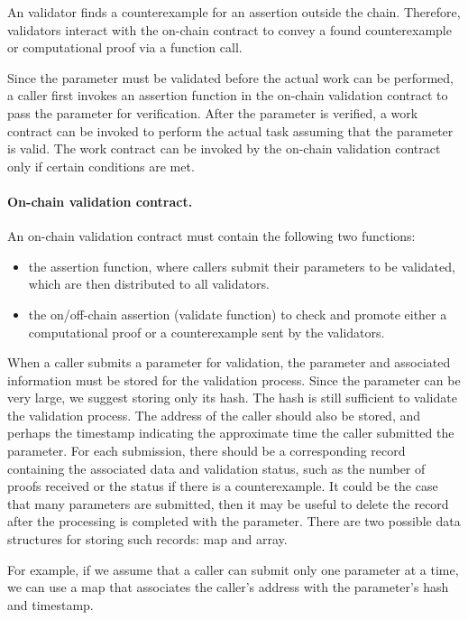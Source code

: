 \documentclass[runningheads]{llncs}
\begin{document}
An validator finds a counterexample for an assertion outside the chain. Therefore, validators interact with the on-chain contract to convey a found counterexample or computational proof via a function call. 

Since the parameter must be validated before the actual work can be performed, a caller first invokes an assertion function in the on-chain validation contract to pass the parameter for verification. After the parameter is verified, a work contract can be invoked to perform the actual task assuming that the parameter is valid. The work contract can be invoked by the on-chain validation contract only if certain conditions are met.

\paragraph{On-chain validation contract.} An on-chain validation contract must contain the following two functions:  

\begin{itemize}
\item the assertion function, where callers submit their parameters to be validated, which are then distributed to all validators. 
\item the on/off-chain assertion (validate function) to check and promote either a computational proof or a counterexample sent by the validators.
\end{itemize}


When a caller submits a parameter for validation, the parameter and associated information must be stored for the validation process. Since the parameter can be very large, we suggest storing only its hash. The hash is still sufficient to validate the validation process. The address of the caller should also be stored, and perhaps the timestamp indicating the approximate time the caller submitted the parameter. For each submission, there should be a corresponding record containing the associated data and validation status, such as the number of proofs received or the status if there is a counterexample. It could be the case that many parameters are submitted, then it may be useful to delete the record after the processing is completed with the parameter. There are two possible data structures for storing such records: map and array. 

For example, if we assume that a caller can submit only one parameter at a time, we can use a map that associates the caller's address with the parameter's hash and timestamp.
\end{document}
